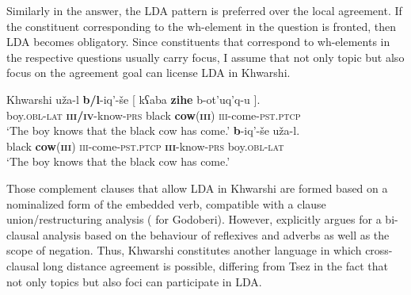 \documentclass[output=paper
,modfonts
,nonflat]{langsci/langscibook}
\begin{document}
Similarly in the answer, the LDA pattern is preferred over the local agreement. If the constituent corresponding to the wh-element in the question is fronted, then LDA becomes obligatory. Since constituents that correspond to wh-elements in the respective questions usually carry focus, I assume that not only topic but also focus on the agreement goal can license LDA in Khwarshi.
\begin{exe}
\ex Khwarshi  \citep[][390]{Khalilova2008}
	\xlist
	\ex
		\gll u\v{z}a-l \textbf{b/l}-iq'-\v{s}e [ k\super ʕaba \textbf{zihe} b-ot'uq'q-u ].\\
			 boy.\textsc{obl-lat} \textbf{\textsc{iii/iv}}-know-\textsc{prs} {} black \textbf{cow}(\textbf{\textsc{iii}}) \textsc{iii}-come-\textsc{pst.ptcp} {}\\
		\glt `The boy knows that the black cow has come.'
	\ex
		 \textbf{b}-iq'-\v{s}e u\v{z}a-l.\\
			 {} black \textbf{cow}(\textbf{\textsc{iii}}) \textsc{iii}-come-\textsc{pst.ptcp} {} \textbf{\textsc{iii}}-know-\textsc{prs} boy.\textsc{obl-lat}\\
		\glt `The boy knows that the black cow has come.'	
	\endxlist
\end{exe}
Those complement clauses that allow LDA in Khwarshi are formed based on a nominalized form of the embedded verb, compatible with a clause union\slash restruc\-turing analysis (\citealt{Haspelmath1999} for Godoberi). However, \citet[386--388]{Khalilova2009} explicitly argues for a bi-clausal analysis based on the behaviour of reflexives and adverbs as well as the scope of negation. Thus, Khwarshi constitutes another language in which cross-clausal long distance agreement is possible, differing from Tsez in the fact that not only topics but also foci can participate in LDA.
\end{document}
